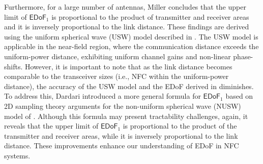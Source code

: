 \documentclass[journal]{IEEEtran}
\theoremstyle{definition}
\begin{document}
Furthermore, for a large number of antennas, Miller \cite{Miller2000} concludes that the upper limit of ${\mathsf{EDoF}}_1$ is proportional to the product of transmitter and receiver areas and it is inversely proportional to the link distance. These findings are derived using the uniform spherical wave (USW) model described in \cite[Eqn. (35)]{Liu2023}. The USW model is applicable in the near-field region, where the communication distance exceeds the uniform-power distance, exhibiting uniform channel gains and non-linear phase-shifts. However, it is important to note that as the link distance becomes comparable to the transceiver sizes (i.e., NFC within the uniform-power distance), the accuracy of the USW model and the EDoF derived in \cite{Miller2000} diminishes. To address this, Dardari introduced a more general formula for ${\mathsf{EDoF}}_1$ based on 2D sampling theory arguments for the non-uniform spherical wave (NUSW) model of \cite{Dardari2020}. Although this formula may present tractability challenges, again, it reveals that the upper limit of ${\mathsf{EDoF}}_1$ is proportional to the product of the transmitter and receiver areas, while it is inversely proportional to the link distance. These improvements enhance our understanding of EDoF in NFC systems.

\end{document}

